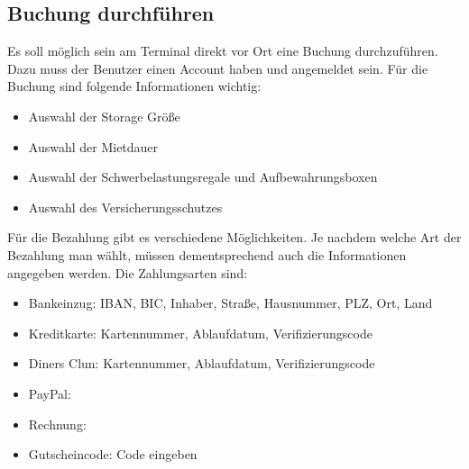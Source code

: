 \subsection{Buchung durchführen}
Es soll möglich sein am Terminal direkt vor Ort eine Buchung durchzuführen. Dazu muss der Benutzer einen Account haben und angemeldet sein. Für die Buchung sind folgende Informationen wichtig:
\begin{itemize}
    \item Auswahl der Storage Größe
    \item Auswahl der Mietdauer
    \item Auswahl der Schwerbelastungsregale und Aufbewahrungsboxen
    \item Auswahl des Versicherungsschutzes
\end{itemize}
Für die Bezahlung gibt es verschiedene Möglichkeiten. Je nachdem welche Art der Bezahlung man wählt, müssen dementsprechend auch die Informationen angegeben werden. Die Zahlungsarten sind:
\begin{itemize}
    \item Bankeinzug: IBAN, BIC, Inhaber, Straße, Hausnummer, PLZ, Ort, Land
    \item Kreditkarte: Kartennummer, Ablaufdatum, Verifizierungscode
    \item Diners Clun: Kartennummer, Ablaufdatum, Verifizierungscode
    \item PayPal:
    \item Rechnung:
    \item Gutscheincode: Code eingeben
\end{itemize}
